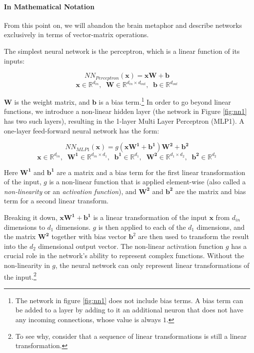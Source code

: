 \documentclass[jair,twoside,11pt,theapa]{article}
\newcommand{\m}[1]{\mathbf{#1}}%
\begin{document}
{\paragraph{In Mathematical Notation}
From this point on, we will abandon the brain metaphor and describe networks exclusively
in terms of vector-matrix operations.

\noindent The simplest neural network is the perceptron, which is a linear function of its inputs:

\[
NN_{Perceptron}(\m{x}) = \m{x}\m{W} + \m{b} 
\]
\[
\m{x} \in \mathbb{R}^{d_{in}}, \;\; \m{W} \in \mathbb{R}^{d_{in} \times d_{out}}, \;\; \m{b} \in \mathbb{R}^{d_{out}}
\]

\noindent $\m{W}$ is the weight matrix, and $\m{b}$ is a bias term.\footnote{The
network in figure \ref{fig:nn1} does not include bias terms. A bias term can be
added to a layer by adding to it an additional neuron that does not have any incoming connections,
whose value is always $1$.}
In order to go beyond linear functions, we introduce a non-linear hidden layer (the network in Figure \ref{fig:nn1} has two such layers),
resulting in the 1-layer Multi Layer Perceptron (MLP1).
A one-layer feed-forward neural network has the form:

\[ NN_{MLP1}(\m{x}) = g(\m{x}\m{W^1} + \m{b^1})\m{W^2} + \m{b^2} \]
\[ \m{x} \in \mathbb{R}^{d_{in}}, \;\;
   \m{W^1} \in \mathbb{R}^{d_{in} \times d_{1}}, \;\; \m{b^1} \in \mathbb{R}^{d_{1}}, \;\;
   \m{W^2} \in \mathbb{R}^{d_{1} \times d_{2}}, \;\; \m{b^2} \in \mathbb{R}^{d_{2}} 
\]

Here $\m{W^1}$ and $\m{b^1}$ are a matrix and a bias term for the first linear
transformation of the input, $g$ is a non-linear function that is applied element-wise 
(also called a \emph{non-linearity} or an \emph{activation function}), and
$\m{W^2}$ and $\m{b^2}$ are the matrix and bias term for a second linear transform.

Breaking it down, $\m{x}\m{W^1}+\m{b^1}$ is a linear transformation of the input $\m{x}$
from $d_{in}$ dimensions to $d_1$ dimensions. $g$ is then applied to each of the
$d_1$ dimensions, and the matrix $\m{W^2}$ together with bias vector $\m{b}^2$ are then
used to transform the result into the $d_2$ dimensional output vector.
The non-linear activation function $g$ has a crucial role in the network's
ability to represent complex functions. Without the non-linearity in $g$, the
neural network can only represent linear transformations of the
input.\footnote{To see why, consider that a sequence of linear transformations
is still a linear transformation.}

}
\end{document}
